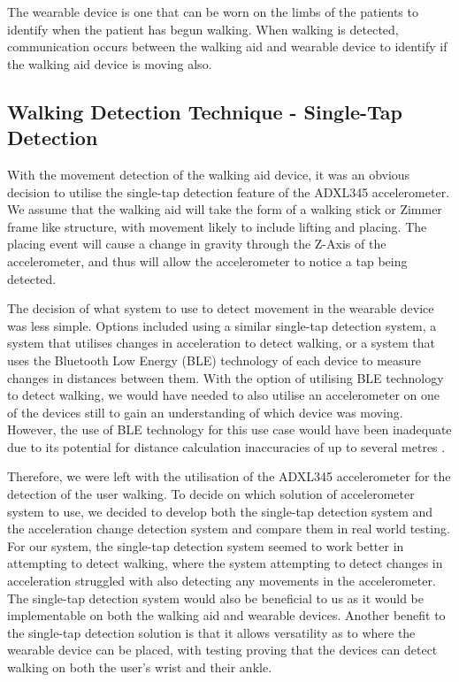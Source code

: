         The wearable device is one that can be worn on the limbs of the patients to identify when the patient has begun walking. When walking is detected, communication occurs between the walking aid and wearable device to identify if the walking aid device is moving also. 

        \subsection{Walking Detection Technique - Single-Tap Detection}
        \label{subsec:walking_detection_technique}

           With the movement detection of the walking aid device, it was an obvious decision to utilise the single-tap detection feature of the ADXL345 accelerometer. We assume that the walking aid will take the form of a walking stick or Zimmer frame like structure, with movement likely to include lifting and placing. The placing event will cause a change in gravity through the Z-Axis of the accelerometer, and thus will allow the accelerometer to notice a tap being detected.

           The decision of what system to use to detect movement in the wearable device was less simple. Options included using a similar single-tap detection system, a system that utilises changes in acceleration to detect walking, or a system that uses the Bluetooth Low Energy (BLE) technology of each device to measure changes in distances between them. With the option of utilising BLE technology to detect walking, we would have needed to also utilise an accelerometer on one of the devices still to gain an understanding of which device was moving. However, the use of BLE technology for this use case would have been inadequate due to its potential for distance calculation inaccuracies of up to several metres \cite{Fachri_2019}. 

           Therefore, we were left with the utilisation of the ADXL345 accelerometer for the detection of the user walking. To decide on which solution of accelerometer system to use, we decided to develop both the single-tap detection system and the acceleration change detection system and compare them in real world testing. For our system, the single-tap detection system seemed to work better in attempting to detect walking, where the system attempting to detect changes in acceleration struggled with also detecting any movements in the accelerometer. The single-tap detection system would also be beneficial to us as it would be implementable on both the walking aid and wearable devices. Another benefit to the single-tap detection solution is that it allows versatility as to where the wearable device can be placed, with testing proving that the devices can detect walking on both the user's wrist and their ankle. 

